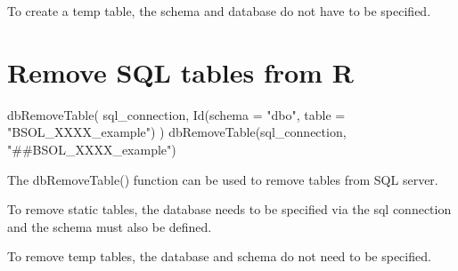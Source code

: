 \documentclass[
]{book}
\newenvironment{Shaded}{\begin{snugshade}}{\end{snugshade}}
\newcommand{\AttributeTok}[1]{\textcolor[rgb]{0.77,0.63,0.00}{#1}}
\newcommand{\FunctionTok}[1]{\textcolor[rgb]{0.00,0.00,0.00}{#1}}
\newcommand{\NormalTok}[1]{#1}
\newcommand{\StringTok}[1]{\textcolor[rgb]{0.31,0.60,0.02}{#1}}
\begin{document}
To create a temp table, the schema and database do not have to be specified.

\hypertarget{remove-sql-tables-from-r}{%
\section{Remove SQL tables from R}\label{remove-sql-tables-from-r}}

\begin{Shaded}
\begin{Highlighting}[]
\FunctionTok{dbRemoveTable}\NormalTok{(}
\NormalTok{  sql\_connection,}
  \FunctionTok{Id}\NormalTok{(}\AttributeTok{schema =} \StringTok{"dbo"}\NormalTok{, }\AttributeTok{table =} \StringTok{"BSOL\_XXXX\_example"}\NormalTok{)}
\NormalTok{)}
\FunctionTok{dbRemoveTable}\NormalTok{(sql\_connection, }\StringTok{"\#\#BSOL\_XXXX\_example"}\NormalTok{)}
\end{Highlighting}
\end{Shaded}

The dbRemoveTable() function can be used to remove tables from SQL server.

To remove static tables, the database needs to be specified via the sql connection and the schema must also be defined.

To remove temp tables, the database and schema do not need to be specified.

  
\end{document}
